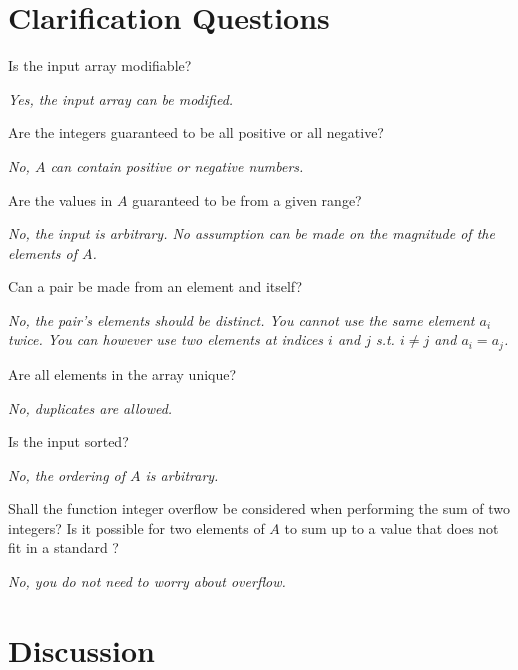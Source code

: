 \section{Clarification Questions}
\begin{QandA}
	\item Is the input array modifiable?
	\begin{answered}
		\textit{Yes, the input array can be modified.}
	\end{answered}	
	\item Are the integers guaranteed to be all positive or all negative? 
	\begin{answered}
		\textit{No, $A$ can contain positive or negative numbers.}
	\end{answered}
	\item Are the values in $A$ guaranteed to be from a given range?
	\begin{answered}
		\textit{No, the input is arbitrary. No assumption can be made on the magnitude of the elements of $A$.}
	\end{answered}
	\item Can a pair be made from an element and itself?
	\begin{answered}
		\textit{No, the pair's elements should be distinct. You cannot use the same element $a_i$ twice. You can however use two elements at indices $i$ and $j$ s.t. $i \neq j$ and $a_i=a_j$.}
	\end{answered}
	\item  Are all elements in the array unique?
	\begin{answered}
		\textit{No, duplicates are allowed.}
	\end{answered}
	\item Is the input sorted?
	\begin{answered}
		\textit{No, the ordering of $A$ is arbitrary.}
	\end{answered}
	\item Shall the function integer overflow be considered when performing the sum of two integers? Is it possible for two elements of $A$ to sum up to a value that does not fit in a standard ?
	\begin{answered}
		\textit{No, you do not need to worry about overflow.}
	\end{answered}
\end{QandA}


\section{Discussion}

